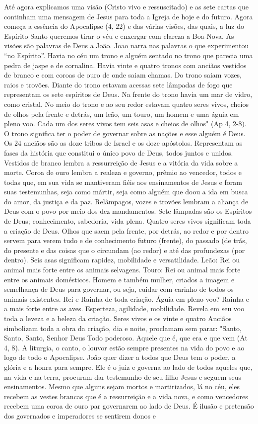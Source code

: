 \documentclass[
]{book}
\begin{document}
Até agora explicamos uma visão (Cristo vivo e ressuscitado) e as sete cartas que continham uma mensagem de Jesus para toda a Igreja de hoje e do futuro. Agora começa a essência do Apocalipse (4, 22) e das várias visões, das quais, a luz do Espírito Santo queremos tirar o véu e enxergar com clareza a Boa-Nova. As visões são palavras de Deus a João. Joao narra nas palavras o que experimentou ``no Espírito''. Havia no céu um trono e alguém sentado no trono que parecia uma pedra de jaspe e de cornalina. Havia vinte e quatro tronos com anciãos vestidos de branco e com coroas de ouro de onde saiam chamas. Do trono saiam vozes, raios e trovões. Diante do trono estavam acessas sete lâmpadas de fogo que representam os sete espíritos de Deus. Na frente do trono havia um mar de vidro, como cristal. No meio do trono e ao seu redor estavam quatro seres vivos, cheios de olhos pela frente e detrás, um leão, um touro, um homem e uma águia em pleno voo. Cada um dos seres vivos tem seis asas e cheios de olhos" (Ap 4, 2-8). O trono significa ter o poder de governar sobre as nações e esse alguém é Deus. Os 24 anciãos são as doze tribos de Israel e os doze apóstolos. Representam as fases da história que constitui o único povo de Deus, todos juntos e unidos. Vestidos de branco lembra a ressurreição de Jesus e a vitória da vida sobre a morte. Coroa de ouro lembra a realeza e governo, prêmio ao vencedor, todos e todas que, em sua vida se mantiveram fiéis aos ensinamentos de Jesus e foram suas testemunhas, seja como mártir, seja como alguém que doou a ida em busca do amor, da justiça e da paz. Relâmpagos, vozes e trovões lembram a aliança de Deus com o povo por meio dos dez mandamentos. Sete lâmpadas são os Espíritos de Deus; conhecimento, sabedoria, vida plena. Quatro seres vivos significam toda a criação de Deus. Olhos que saem pela frente, por detrás, ao redor e por dentro servem para verem tudo e de conhecimento futuro (frente), do passado (de trás, do presente e das coisas que o circundam (ao redor) e até das profundezas (por dentro). Seis asas significam rapidez, mobilidade e versatilidade. Leão: Rei ou animal mais forte entre os animais selvagens. Touro: Rei ou animal mais forte entre os animais domésticos. Homem e também mulher, criados a imagem e semelhança de Deus para governar, ou seja, cuidar com carinho de todos os animais existentes. Rei e Rainha de toda criação. Águia em pleno voo? Rainha e a mais forte entre as aves. Esperteza, agilidade, mobilidade. Revela em seu voo toda a leveza e a beleza da criação. Seres vivos e os vinte e quatro Anciãos simbolizam toda a obra da criação, dia e noite, proclamam sem parar: "Santo, Santo, Santo, Senhor Deus Todo poderoso. Aquele que é, que era e que vem (At 4, 8). A liturgia, o canto, o louvor estão sempre presentes na vida do povo e ao logo de todo o Apocalipse. João quer dizer a todos que Deus tem o poder, a glória e a honra para sempre. Ele é o juiz e governa ao lado de todos aqueles que, na vida e na terra, procuram dar testemunho de seu filho Jesus e seguem seus ensinamentos. Mesmo que alguns sejam mortos e martirizados, lá no céu, eles recebem as vestes brancas que é a ressurreição e a vida nova, e como vencedores recebem uma coroa de ouro par governarem ao lado de Deus. É ilusão e pretensão dos governados e imperadores se sentirem donos e 
\end{document}
